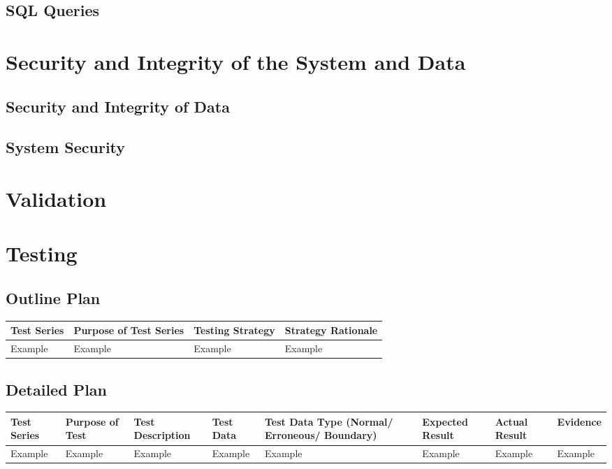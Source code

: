 \subsection{SQL Queries}

\section{Security and Integrity of the System and Data}

\subsection{Security and Integrity of Data}

\subsection{System Security}

\section{Validation}

\section{Testing}

\begin{landscape}
\subsection{Outline Plan}

\begin{center}
    \begin{tabular}{|p{2cm}|p{5cm}|p{5cm}|p{4cm}|}
        \hline
        \textbf{Test Series} & \textbf{Purpose of Test Series} & \textbf{Testing Strategy} & \textbf{Strategy Rationale}\\ \hline
        Example & Example & Example & Example \\ \hline
    \end{tabular}
\end{center}

\subsection{Detailed Plan}

\begin{center}
    \begin{longtable}{|p{1.5cm}|p{2.5cm}|p{2.5cm}|p{2cm}|p{2cm}|p{2cm}|p{2cm}|p{2cm}|}
        \hline
        \textbf{Test Series} & \textbf{Purpose of Test} & \textbf{Test Description} & \textbf{Test Data} & \textbf{Test Data Type (Normal/ Erroneous/ Boundary)} & \textbf{Expected Result} & \textbf{Actual Result} & \textbf{Evidence}\\ \hline
        Example & Example & Example & Example & Example & Example & Example & Example \\ \hline
    \end{longtable}
\end{center}
\end{landscape}